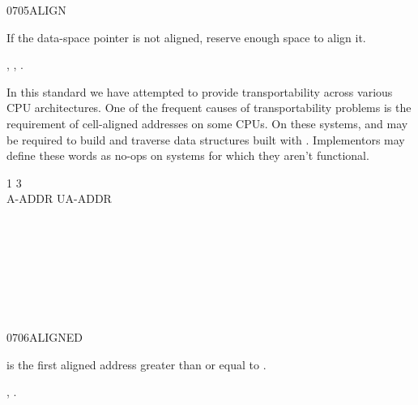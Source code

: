 \begin{worddef}{0705}{ALIGN}
\item \stack{}{}

	If the data-space pointer is not aligned, reserve enough space
	to align it.

\see {},
	,
	.

	\begin{rationale} %
		In this standard we have attempted to provide transportability
		across various CPU architectures. One of the frequent causes
		of transportability problems is the requirement of cell-aligned
		addresses on some CPUs. On these systems,  and
		 may be required to build and traverse data
		structures built with . Implementors may define these
		words as no-ops on systems for which they aren't functional.
	\end{rationale}

	\begin{testing} %
		\ttfamily
		  1      3   \\
		 A-ADDR   UA-ADDR \\
		 \\
		 \\
		 \\
		 \\
		 \\
		 \\
		 \\
	\end{testing}
\end{worddef}


\begin{worddef}{0706}{ALIGNED}
\item {}

	 is the first aligned address greater than or equal
	to .

\see {},
	.
\end{worddef}

